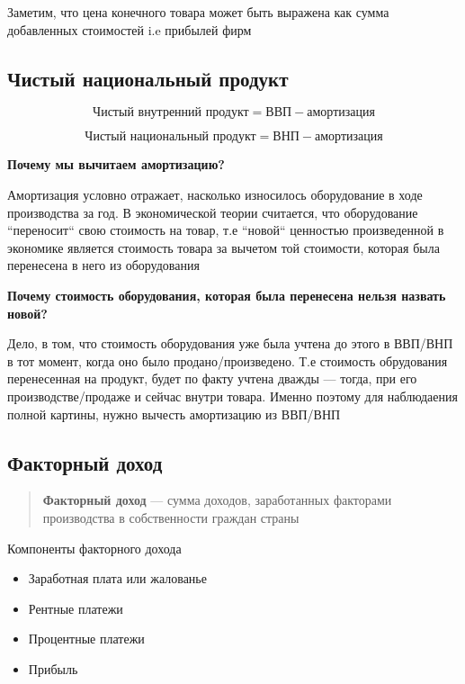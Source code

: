 \documentclass{article}
\begin{document}
    Заметим, что цена конечного товара может быть выражена как сумма добавленных стоимостей i.e прибылей фирм


    \subsection{Чистый национальный продукт}

    \begin{equation}
        \text{Чистый внутренний продукт} = \text{ВВП} - \text{амортизация}
    \end{equation}

     \begin{equation}
        \text{Чистый национальный продукт} = \text{ВНП} - \text{амортизация}
    \end{equation}

    \textbf{Почему мы вычитаем амортизацию?}

    \quad

    Амортизация условно отражает, насколько износилось оборудование в ходе производства за год. В экономической теории
    считается, что оборудование ``переносит`` свою стоимость на товар, т.е ``новой`` ценностью произведенной в экономике является
    стоимость товара за вычетом той стоимости, которая была перенесена в него из оборудования

    \quad

    \textbf{Почему стоимость оборудования, которая была перенесена нельзя назвать новой?}

    \quad

    Дело, в том, что стоимость оборудования уже была учтена до этого в ВВП/ВНП в тот момент, когда оно
    было продано/произведено. Т.е стоимость обрудования перенесенная на продукт, будет по факту учтена дважды --- тогда,
    при его производстве/продаже и сейчас внутри товара. Именно поэтому для наблюдаения полной картины, нужно вычесть амортизацию из ВВП/ВНП

    \subsection{Факторный доход}

    \begin{quote}
        \textbf{Факторный доход} --- сумма доходов, заработанных факторами производства
        в собственности граждан страны
    \end{quote}

    Компоненты факторного дохода
    \begin{itemize}
        \item Заработная плата или жалованье
        \item Рентные платежи
        \item Процентные платежи
        \item Прибыль
    \end{itemize}
\end{document}
